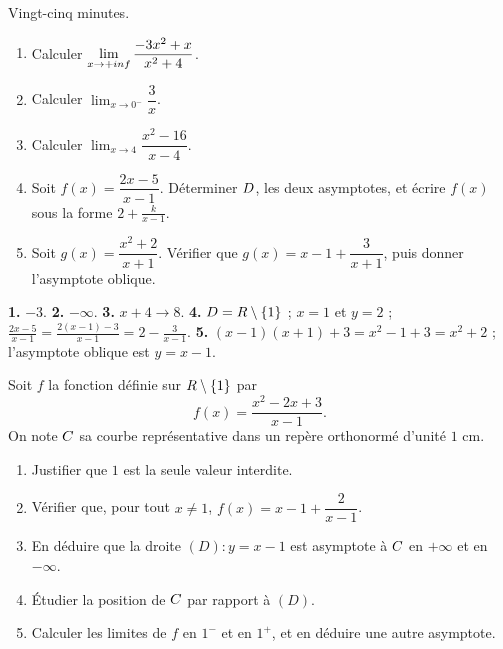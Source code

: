 \begin{jemeteste}
Vingt-cinq minutes.

\begin{enumerate}[label=\textbf{\arabic*.}, leftmargin=*, itemsep=0.3em]
  \item Calculer $\limpinf \dfrac{-3x^{2}+x}{x^{2}+4}$.
  \item Calculer $\displaystyle\lim_{x \to 0^{-}} \dfrac{3}{x}$.
  \item Calculer $\displaystyle\lim_{x \to 4} \dfrac{x^{2}-16}{x-4}$.
  \item Soit $f(x) = \dfrac{2x-5}{x-1}$. Déterminer $D$, les deux
        asymptotes, et écrire $f(x)$ sous la forme $2+\frac{k}{x-1}$.
  \item Soit $g(x) = \dfrac{x^{2}+2}{x+1}$. Vérifier que
        $g(x) = x-1+\dfrac{3}{x+1}$, puis donner l'asymptote oblique.
\end{enumerate}
\end{jemeteste}

\begin{corrige}[je me teste]
\textbf{1.} $-3$.
\textbf{2.} $-\infty$.
\textbf{3.} $x+4 \to 8$.
\textbf{4.} $D = R\setminus\{1\}$ ; $x = 1$ et $y = 2$ ;
$\frac{2x-5}{x-1} = \frac{2(x-1)-3}{x-1} = 2-\frac{3}{x-1}$.
\textbf{5.} $(x-1)(x+1)+3 = x^{2}-1+3 = x^{2}+2$ \checkmark ; l'asymptote
oblique est $y = x-1$.
\end{corrige}

\begin{commeaubac}
Soit $f$ la fonction définie sur $R\setminus\{1\}$ par
\[
  f(x) = \frac{x^{2}-2x+3}{x-1}.
\]
On note $C$ sa courbe représentative dans un repère orthonormé d'unité
$1$ cm.

\begin{enumerate}[label=\textbf{\arabic*.}, leftmargin=*, itemsep=0.25em]
  \item Justifier que $1$ est la seule valeur interdite. 
  \item Vérifier que, pour tout $x \neq 1$,
        $f(x) = x-1+\dfrac{2}{x-1}$. 
  \item En déduire que la droite $(D) : y = x-1$ est asymptote à $C$ en
        $+\infty$ et en $-\infty$. \bareme{1 pt}
  \item Étudier la position de $C$ par rapport à $(D)$. \bareme{1 pt}
  \item Calculer les limites de $f$ en $1^{-}$ et en $1^{+}$, et en déduire
        une autre asymptote. \bareme{1 pt}
\end{enumerate}
\end{commeaubac}

